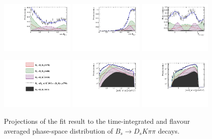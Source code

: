 \begin{figure}[h]
		\includegraphics[width=0.32\textwidth, height = !]{figs/lassoFit/LASSO/h_cosTheta_Kpi_mod.pdf} 
		\includegraphics[width=0.32\textwidth, height = !]{figs/lassoFit/LASSO/h_cosTheta_Dspi_mod.pdf} 
		\includegraphics[width=0.32\textwidth, height = !]{figs/lassoFit/LASSO/h_phi_Kpi_Dspi_mod.pdf} 

		\caption{\small Projections of the fit result to the time-integrated and flavour averaged phase-space distribution of $B_s \to D_s K \pi \pi$  decays. } 		
				\label{fig:lassoFit}

	\centering
		\includegraphics[width=0.32\textwidth, height = !]{figs/lassoFit/LASSO/leg.pdf} 
		\includegraphics[width=0.32\textwidth, height = !]{figs/lassoFit/LASSO/m_Kpipi_mod_log.pdf} 
		\includegraphics[width=0.32\textwidth, height = !]{figs/lassoFit/LASSO/m_Dspipi_mod_log.pdf} 


\end{figure}
